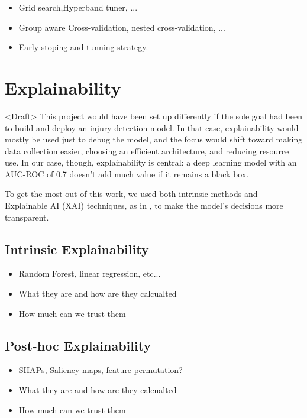 \begin{itemize}
    \item Grid search,Hyperband tuner, ...
    \item Group aware Cross-validation, nested cross-validation, ...
    \item Early stoping and tunning strategy.
\end{itemize}


\section{Explainability}\label{sec:method-explainability}
<Draft> This project would have been set up differently if the sole goal had been to build and deploy an injury detection model. In that case, explainability would mostly be used just to debug the model, and the focus would shift toward making data collection easier, choosing an efficient architecture, and reducing resource use. In our case, though, explainability is central: a deep learning model with an AUC-ROC of 0.7 doesn't add much value if it remains a black box.

To get the most out of this work, we used both intrinsic methods and Explainable AI (XAI) techniques, as in \cite{FuentesJimnez2025}, to make the model's decisions more transparent.

\subsection{Intrinsic Explainability}\label{subsec:method-intrinsic-explainability}
\begin{itemize}
    \item Random Forest, linear regression, etc...
    \item What they are and how are they calcualted
    \item How much can we trust them
\end{itemize}

\subsection{Post-hoc Explainability}\label{subsec:method-posthoc-explainability}
\begin{itemize}
    \item SHAPs, Saliency maps, feature permutation?
    \item What they are and how are they calcualted
    \item How much can we trust them
\end{itemize}

